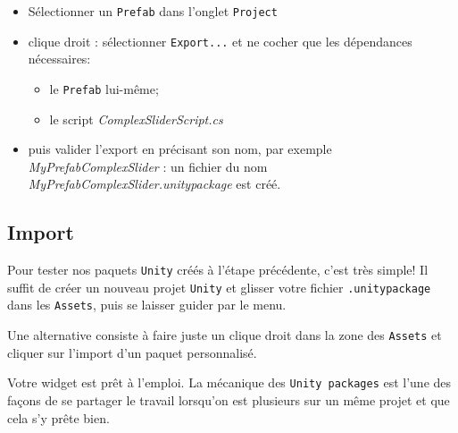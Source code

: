 \documentclass[a4paper,10pt]{article}
\newenvironment{solution}%
{\begin{tcolorbox}[breakable,colback=red!5!white,colframe=red!75!black,title=Solution]}%
{\end{tcolorbox}}
\newenvironment{info}%
{\begin{tcolorbox}[breakable,colback=green!5!white,colframe=green!75!black,title=Information]}%
{\end{tcolorbox}}
\begin{document}
\ifversionenseignant
\begin{solution}
\begin{itemize}
	\item Sélectionner un \texttt{Prefab} dans l'onglet \texttt{Project}
	\item clique droit : sélectionner \texttt{Export...} et ne cocher que les dépendances nécessaires:
	\begin{itemize}
		\item le \texttt{Prefab} lui-même;
		\item le script \textit{ComplexSliderScript.cs}
	\end{itemize}
	\item puis valider l'export en précisant son nom, par exemple \textit{MyPrefabComplexSlider} : un fichier du nom \textit{MyPrefabComplexSlider.unitypackage} est créé.
\end{itemize}
\end{solution}
\fi 


\subsection{Import}

Pour tester nos paquets \texttt{Unity} créés à l'étape précédente, c'est très simple! Il suffit de créer un nouveau projet \texttt{Unity} et glisser votre fichier \texttt{.unitypackage} dans les \texttt{Assets}, puis se laisser guider par le menu.

\begin{info}
Une alternative consiste  à faire juste un clique droit dans la zone des \texttt{Assets} et cliquer sur l'import d'un paquet personnalisé.
\end{info}

Votre widget est prêt à l'emploi. La mécanique des \texttt{Unity packages} est l'une des façons de se partager le travail lorsqu'on est plusieurs sur un même projet et que cela s'y prête bien. 
\end{document}
